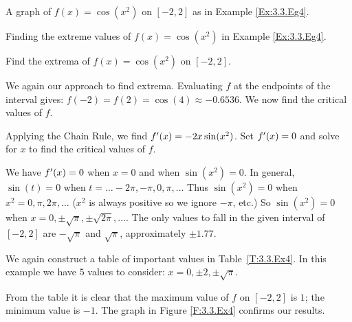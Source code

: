 \begin{marginfigure}[-1cm]
\caption{A graph of $f(x)=\cos(x^2)$ on $[-2,2]$ as in Example \ref{Ex:3.3.Eg4}. } \label{F:3.3.Ex4}
\end{marginfigure}

\begin{margintable}
\begin{center}
\end{center}
\caption{Finding the extreme values of $f(x)= \cos (x^2)$ in Example \ref{Ex:3.3.Eg4}.} \label{T:3.3.Ex4}
\end{margintable}

\begin{example} \label{Ex:3.3.Eg4}
Find the extrema of  $f(x) = \cos (x^2)$ on $[-2,2]$.

\solution
We again our approach to find extrema. Evaluating $f$ at the endpoints of the interval gives: $f(-2) = f(2) = \cos (4) \approx -0.6536.$ We now find the critical values of $f$.

Applying the Chain Rule, we find $f'(x) = -2x\sin (x^2)$. Set $f'(x) = 0$ and solve for $x$ to find the critical values of $f$. 

We have $f'(x) = 0$ when $x = 0$ and when $\sin (x^2) = 0$. In general, $\sin(t) = 0$ when $t = \ldots -2\pi, -\pi, 0, \pi, \ldots$ Thus $\sin (x^2) = 0$ when $x^2 = 0, \pi, 2\pi, \ldots$ ($x^2$ is always positive so we ignore $-\pi$, etc.) So $\sin (x^2)=0$ when $x= 0, \pm \sqrt{\pi}, \pm\sqrt{2\pi}, \ldots$. The only values to fall in the given interval of $[-2,2]$ are $-\sqrt{\pi}$ and $\sqrt{\pi}$, approximately $\pm 1.77$.

We again construct a table of important values in Table~\ref{T:3.3.Ex4}. In this example we have $5$ values to consider: $x= 0, \pm 2, \pm\sqrt{\pi}$. 

From the table it is clear that the maximum value of $f$ on $[-2,2]$ is $1$; the minimum value is $-1$. The graph in Figure \ref{F:3.3.Ex4} confirms our results.
\end{example}